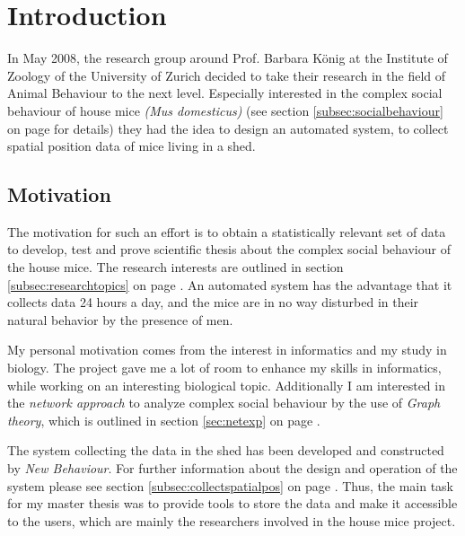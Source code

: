 \newpage

\section{Introduction}
\label{sec:introduction}

In May 2008, the research group around Prof. Barbara K\"onig at the Institute of Zoology of the University of Zurich decided to take their research in the field of Animal Behaviour to the next level. Especially interested in the complex social behaviour of house mice \textit{(Mus domesticus)} (see section \ref{subsec:socialbehaviour} on page \pageref{subsec:socialbehaviour} for details) they had the idea to design an automated system, to collect spatial position data of mice living in a shed.

\subsection{Motivation}
\label{subsec:motivation}
The motivation for such an effort is to obtain a statistically relevant set of data to develop, test and prove scientific thesis about the complex social behaviour of the house mice. The research interests are outlined in section \ref{subsec:researchtopics} on page \pageref{subsec:researchtopics}. An automated system has the advantage that it collects data 24 hours a day, and the mice are in no way disturbed in their natural behavior by the presence of men.

My personal motivation comes from the interest in informatics and my study in biology. The project gave me a lot of room to enhance my skills in informatics, while working on an interesting biological topic. Additionally I am interested in the \textit{network approach} to analyze complex social behaviour by the use of \textit{Graph theory}\cite{wiki:graph_theory}, which is outlined in section \ref{sec:netexp} on page \pageref{sec:netexp}.

The system collecting the data in the shed has been developed and constructed by \textit{New Behaviour}. For further information about the design and operation of the system please see section \ref{subsec:collectspatialpos} on page \pageref{subsec:collectspatialpos}. Thus, the main task for my master thesis was to provide tools to store the data and make it accessible to the users, which are mainly the researchers involved in the house mice project. 

